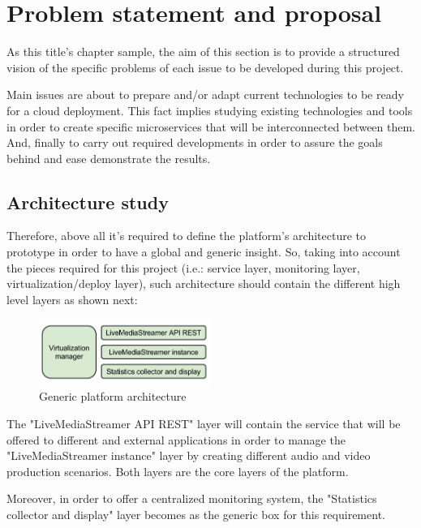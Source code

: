 \chapter{Problem statement and proposal}\label{B:problemStatementAndProposal}

As this title's chapter sample, the aim of this section is to provide a structured vision of the specific problems of each issue to be developed during this project.

Main issues are about to prepare and/or adapt current technologies to be ready for a cloud deployment. This fact implies studying existing technologies and tools in order to create specific microservices that will be interconnected between them. And, finally to carry out required developments in order to assure the goals behind and ease demonstrate the results.

\section{Architecture study}

Therefore, above all it's required to define the platform's architecture to prototype in order to have a global and generic insight. So, taking into account the pieces required for this project (i.e.: service layer, monitoring layer, virtualization/deploy layer), such architecture should contain the different high level layers as shown next:
\begin{figure}[htb]
\begin{center}
\includegraphics[width=0.5\textwidth]{./images/generalArch.png}
\caption{Generic platform architecture}
\label{F:genericPlatArch}
\end{center}
\end{figure}

The "LiveMediaStreamer API REST" layer will contain the service that will be offered to different and external applications in order to manage the "LiveMediaStreamer instance" layer by creating different audio and video production scenarios. Both layers are the core layers of the platform.

Moreover, in order to offer a centralized monitoring system, the "Statistics collector and display" layer becomes as the generic box for this requirement.

